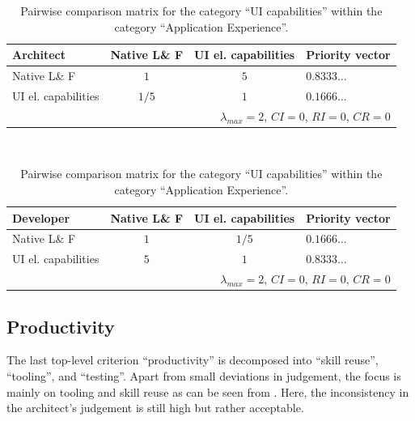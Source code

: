 \begin{table}[h!]
    \centering
    \begin{tabular}{lccl}
        \hline
        \textbf{Architect}  & Native L\& F & UI el. capabilities & Priority vector \\
        \hline
        Native L\& F        & $1$          & $5$                 & $0.8333\ldots$  \\
        UI el. capabilities & $1/5$        & $1$                 & $0.1666\ldots$  \\
        \hline
        \multicolumn{4}{r}{$\lambda_{max} = 2$, $CI = 0$, $RI = 0$, $CR = 0$}      \\
        \hline
    \end{tabular}
    \\\vspace{1em}
    \begin{tabular}{lccl}
        \hline
        \textbf{Developer}  & Native L\& F & UI el. capabilities & Priority vector \\
        \hline
        Native L\& F        & $1$          & $1/5$               & $0.1666\ldots$  \\
        UI el. capabilities & $5$          & $1$                 & $0.8333\ldots$  \\
        \hline
        \multicolumn{4}{r}{$\lambda_{max} = 2$, $CI = 0$, $RI = 0$, $CR = 0$}      \\
        \hline
    \end{tabular}
    \caption{Pairwise comparison matrix for the category ``UI capabilities'' within the category ``Application Experience''.}
    \label{tab:ui}
\end{table}

\subsection{Productivity}

The last top-level criterion ``productivity'' is decomposed into ``skill reuse'', ``tooling'', and ``testing''. Apart from small deviations in judgement, the focus is mainly on tooling and skill reuse as can be seen from . Here, the inconsistency in the architect's judgement is still high but rather acceptable.

